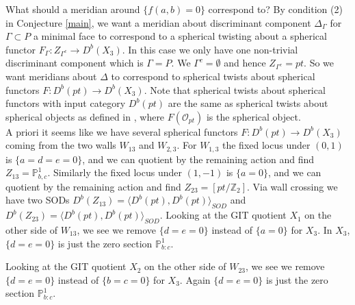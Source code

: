 \documentclass[oneside]{amsart}
\theoremstyle{definition}
\theoremstyle{definition}
\theoremstyle{definition}
\theoremstyle{definition}
\newcommand{\PP}{\mathbb{P}}
\newcommand{\Z}{\mathbb{Z}}
\newcommand{\Os}{\mathcal{O}}
\begin{document}
\newline
What should a meridian around $\{ f(a,b)=0\}$ correspond to? By condition (2) in Conjecture \ref{main}, we want a meridian about discriminant component $\Delta_{\Gamma}$ for $\Gamma \subset P$ a minimal face to correspond to a spherical twisting about a spherical functor $F_{\Gamma}: Z_{\Gamma^c} \to D^b(X_3)$. In this case we only have one non-trivial discriminant component which is $\Gamma = P$. We $\Gamma^c = \emptyset$ and hence $Z_{\Gamma^c} = pt$. So we want meridians about $\Delta$ to correspond to spherical twists about spherical functors $F: D^b(pt) \to D^b(X_3)$. Note that spherical twists about spherical functors with input category $D^b(pt)$ are the same as spherical twists about spherical objects as defined in \cite[Chapter 8]{huybrechts}, where $F(\Os_{pt})$ is the spherical object. \\
\newline 
A priori it seems like we have several spherical functors $F: D^b(pt) \to D^b(X_3)$ coming from the two walls $W_{13}$ and $W_{2,3}$. For $W_{1,3}$ the fixed locus under $(0,1)$ is $\{ a=d=e=0 \}$, and we can quotient by the remaining action and find $Z_{13} = \PP^1_{b,c}$. Similarly the fixed locus under $(1,-1)$ is $\{ a=0\}$, and we can quotient by the remaining action and find $Z_{23} = \left[ pt / \Z_2\right]$. Via wall crossing we have two SODs $D^b(Z_{13}) = \langle D^b(pt), D^b(pt) \rangle_{SOD}$ and $D^b(Z_{23}) = \langle D^b(pt), D^b(pt) \rangle_{SOD}$. Looking at the GIT quotient $X_1$ on the other side of $W_{13}$, we see we  remove $\{ d=e=0\}$ instead of $\{ a=0\}$ for $X_3$. In $X_3$, $\{ d=e=0\}$ is just the zero section $\PP^1_{b:c}$.
\begin{center}
\end{center}
Looking at the GIT quotient $X_2$ on the other side of $W_{23}$, we see we  remove $\{ d=e=0\}$ instead of $\{ b=c=0\}$ for $X_3$. Again $\{ d=e=0\}$ is just the zero section $\PP^1_{b:c}$.
\begin{center}
\end{center}
\end{document}
